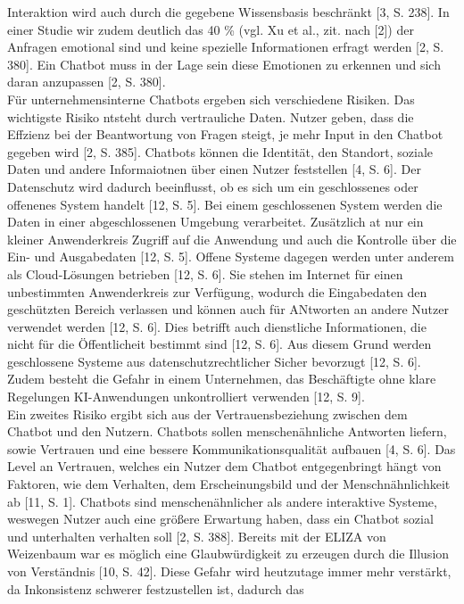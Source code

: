 Interaktion wird auch durch die gegebene Wissensbasis beschränkt [3, S. 238]. In einer Studie wir zudem deutlich das 40 \% (vgl. Xu et al., zit. nach [2])
der Anfragen emotional sind und keine
spezielle Informationen erfragt werden [2, S. 380]. Ein Chatbot muss in der Lage sein diese Emotionen zu erkennen und sich daran anzupassen [2, S. 380]. \\
Für unternehmensinterne Chatbots ergeben sich verschiedene Risiken. Das wichtigste Risiko ntsteht durch vertrauliche Daten. Nutzer geben, dass die Effzienz bei 
der Beantwortung von Fragen steigt, je mehr Input in den Chatbot gegeben wird [2, S. 385]. Chatbots können die Identität, den Standort, soziale Daten und 
andere Informaiotnen über einen Nutzer feststellen [4, S. 6]. Der Datenschutz wird dadurch beeinflusst, ob es sich um ein geschlossenes oder offenenes System
handelt [12, S. 5]. Bei einem geschlossenen System werden die Daten in einer abgeschlossenen Umgebung verarbeitet. Zusätzlich at nur ein kleiner 
Anwenderkreis Zugriff auf die Anwendung und auch die Kontrolle über die Ein- und Ausgabedaten [12, S. 5]. Offene Systeme dagegen werden unter anderem als 
Cloud-Lösungen betrieben [12, S. 6]. Sie stehen im Internet für einen unbestimmten Anwenderkreis zur Verfügung, wodurch die Eingabedaten den geschützten Bereich 
verlassen und können auch für ANtworten an andere Nutzer verwendet werden [12, S. 6]. Dies betrifft auch dienstliche Informationen, die nicht für die Öffentlicheit
bestimmt sind [12, S. 6]. Aus diesem Grund werden geschlossene Systeme aus datenschutzrechtlicher Sicher bevorzugt [12, S. 6]. Zudem besteht die Gefahr in einem 
Unternehmen, das Beschäftigte ohne klare Regelungen KI-Anwendungen unkontrolliert verwenden [12, S. 9]. \\
Ein zweites Risiko ergibt sich aus der Vertrauensbeziehung zwischen dem Chatbot und den Nutzern. Chatbots sollen menschenähnliche Antworten liefern, sowie Vertrauen 
und eine bessere Kommunikationsqualität aufbauen [4, S. 6]. Das Level an Vertrauen, welches ein Nutzer dem Chatbot entgegenbringt hängt von Faktoren, wie dem Verhalten,
dem Erscheinungsbild und der Menschnähnlichkeit ab [11, S. 1]. Chatbots sind menschenähnlicher als andere interaktive Systeme, weswegen Nutzer auch eine größere 
Erwartung haben, dass ein Chatbot sozial und unterhalten verhalten soll [2, S. 388]. Bereits mit der ELIZA von Weizenbaum war es möglich eine Glaubwürdigkeit zu 
erzeugen durch die Illusion von Verständnis [10, S. 42]. Diese Gefahr wird heutzutage immer mehr verstärkt, da Inkonsistenz schwerer festzustellen ist, dadurch das
